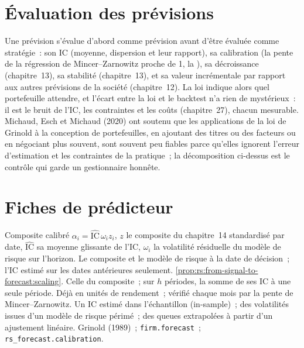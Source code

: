 \section{Évaluation des prévisions}

Une prévision s'évalue d'abord comme prévision avant d'être évaluée comme stratégie~: son IC (moyenne, dispersion et leur rapport), sa calibration (la
pente de la régression de Mincer--Zarnowitz proche de 1, la ), sa décroissance (chapitre~13), sa stabilité (chapitre~13), et sa valeur incrémentale par rapport aux
autres prévisions de la société (chapitre~12). La loi indique alors quel portefeuille attendre, et l'écart entre la loi et le backtest n'a rien de mystérieux~: il
est le bruit de l'IC, les contraintes et les coûts (chapitre~27), chacun mesurable. Michaud, Esch et Michaud (2020) ont soutenu que les applications de
la loi de Grinold à la conception de portefeuilles, en ajoutant des titres ou des facteurs ou en négociant plus souvent, sont souvent peu fiables parce qu'elles ignorent l'erreur d'estimation et
les contraintes de la pratique~; la décomposition ci-dessus est le contrôle qui garde un gestionnaire honnête.

\section{Fiches de prédicteur}

\begin{predictorcard}{Composite calibré}\label{pred:rs:from-signal-to-forecast:calibrated}
 $\alpha_i = \widehat{\mathrm{IC}}\,\omega_i z_i$, $z$ le composite du chapitre~14 standardisé par date, $\widehat{\mathrm{IC}}$ sa
moyenne glissante de l'IC, $\omega_i$ la volatilité résiduelle du modèle de risque sur l'horizon.
 Le composite et le modèle de risque à la date de décision~; l'IC estimé sur les dates antérieures seulement.
 \cref{prop:rs:from-signal-to-forecast:scaling}.
 Celle du composite~; sur $h$ périodes, la somme de ses IC à une seule période.
 Déjà en unités de rendement~; vérifié chaque mois par la pente de Mincer--Zarnowitz.
 Un IC estimé dans l'échantillon (in-sample)~; des volatilités issues d'un modèle de risque périmé~; des queues extrapolées à partir d'un ajustement linéaire.
 Grinold (1989)~; \texttt{firm.forecast}~; \texttt{rs\_forecast.calibration}.
\end{predictorcard}

